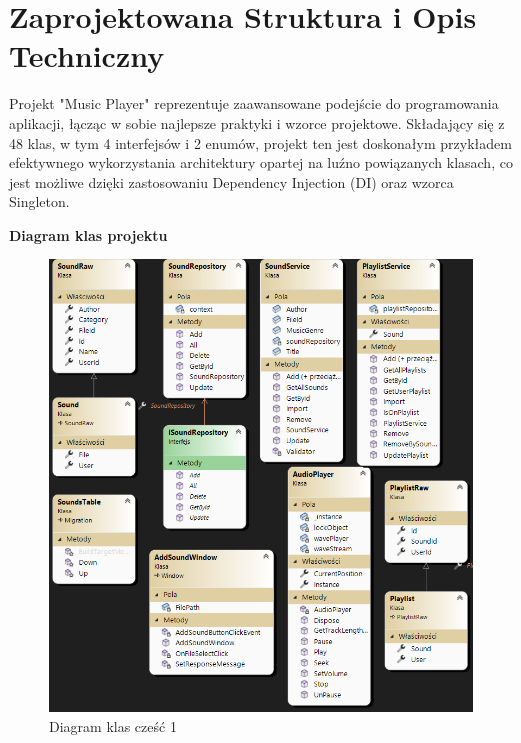 \section{Zaprojektowana Struktura i Opis Techniczny}

Projekt "Music Player" reprezentuje zaawansowane podejście do programowania aplikacji, łącząc w sobie najlepsze praktyki i wzorce projektowe. Składający się z 48 klas, w tym 4 interfejsów i 2 enumów, projekt ten jest doskonałym przykładem efektywnego wykorzystania architektury opartej na luźno powiązanych klasach, co jest możliwe dzięki zastosowaniu Dependency Injection (DI) oraz wzorca Singleton.


\newpage
\textbf{Diagram klas projektu}

\begin{figure}[!ht]
	\begin{center}
	\includegraphics[width=500pt]{figures/diagram_cz1.png}
        \caption{{\footnotesize Diagram klas cześć 1}}
	\end{center}
\end{figure}


